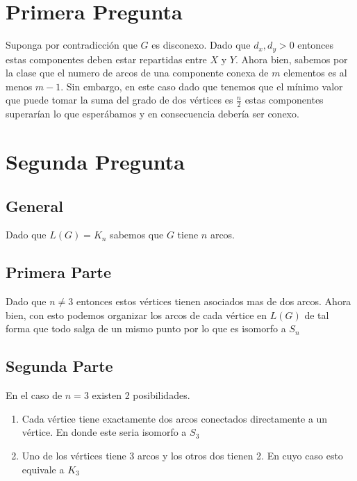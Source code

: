 


    

    \section*{Primera Pregunta}

    Suponga por contradicción que $G$ es disconexo. Dado que $d_x, d_y > 0$ entonces estas componentes deben estar repartidas entre $X$ y $Y$. Ahora bien, sabemos por la clase que el numero de arcos de una componente conexa de $m$ elementos es al menos $m-1$. Sin embargo, en este caso dado que tenemos que el mínimo valor que puede tomar la suma del grado de dos vértices es $\frac{n}{2}$ estas componentes superarían lo que esperábamos y en consecuencia debería ser conexo.

    \section*{Segunda Pregunta}

    \subsection*{General}

    Dado que $L\left( G \right) = K_n$ sabemos que $G$ tiene $n$ arcos.
    
    \subsection*{Primera Parte}

    Dado que $n\neq 3$ entonces estos vértices tienen asociados mas de dos arcos. Ahora bien, con esto podemos organizar los arcos de cada vértice en $L\left( G \right) $ de tal forma que todo salga de un mismo punto por lo que es isomorfo a $S_n$

    \subsection*{Segunda Parte}

    En el caso de $n=3$ existen 2 posibilidades.
     \begin{enumerate}
      \item Cada vértice tiene exactamente dos arcos conectados directamente a un vértice. En donde este seria isomorfo a $S_3$ 
      \item Uno de los vértices tiene 3 arcos y los otros dos tienen 2. En cuyo caso esto equivale a $K_3$
    \end{enumerate}


